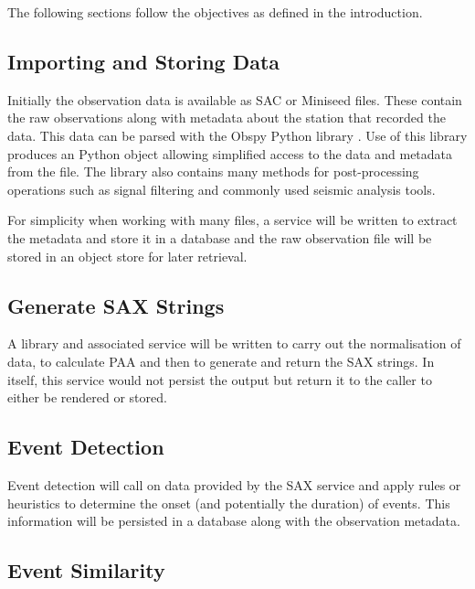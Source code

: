 \documentclass[../report.tex]{subfiles}
\begin{document}
The following sections follow the objectives as defined in the introduction.

\subsection{Importing and Storing Data}

	Initially the observation data is available as SAC or Miniseed files.  These contain the raw observations along with metadata about the station that recorded the data.  This data can be parsed with the Obspy Python library \citep{obspy}.  Use of this library produces an Python object allowing simplified access to the data and metadata from the file.  The library also contains many methods for post-processing operations such as signal filtering and commonly used seismic analysis tools.
	
	
	For simplicity when working with many files, a service will be written to extract the metadata and store it in a database and the raw observation file will be stored in an object store for later retrieval.

\subsection{Generate SAX Strings}

	A library and associated service will be written to carry out the normalisation of data, to calculate PAA and then to generate and return the SAX strings.  In itself, this service would not persist the output but return it to the caller to either be rendered or stored.

\subsection{Event Detection}

	Event detection will call on data provided by the SAX service and apply rules or heuristics to determine the onset (and potentially the duration) of events.  This information will be persisted in a database along with the observation metadata.
	
\subsection{Event Similarity}
\end{document}
